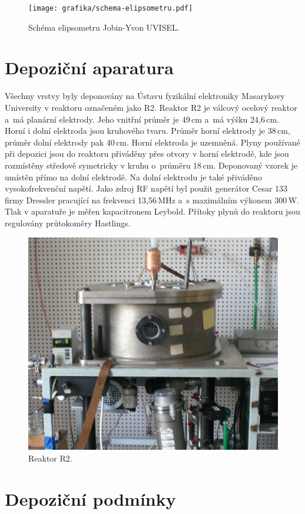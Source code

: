 \begin{figure}
	\centering
	\texttt{[image: grafika/schema-elipsometru.pdf]}
	\caption{Schéma elipsometru Jobin-Yvon UVISEL.}
	\label{elipsometrimg}
\end{figure}

\section{Depoziční aparatura}
Všechny vrstvy byly deponovány na Ústavu fyzikální elektroniky Masarykovy University v reaktoru označeném jako R2. Reaktor R2 je válcový ocelový reaktor a~má planární elektrody. Jeho vnitřní průměr je 49\,cm a~má výšku 24,6\,cm. Horní i dolní elektroda jsou kruhového tvaru. Průměr horní elektrody je 38\,cm, průměr dolní elektrody pak 40\,cm. Horní elektroda je uzemněná. Plyny používané při depozici jsou do reaktoru přiváděny přes otvory v horní elektrodě, kde jsou rozmístěny středově symetricky v kru\-hu o~průměru 18\,cm. Deponovaný vzorek je umístěn přímo na dolní elektrodě. Na dolní elektrodu je také přiváděno vysokofrekvenční napětí. Jako zdroj RF napětí byl použit generátor Cesar 133 firmy Dressler pracující na frekvenci 13,56\,MHz a~s maximálním výkonem 300\,W. Tlak v aparatuře je měřen kapacitronem Leybold. Přítoky plynů do reaktoru jsou regulovány průtokoměry Hastlings.

\begin{figure}
	\centering
	\includegraphics[width=120mm]{grafika/R2.jpg}
	\caption{Reaktor R2.}
	\label{R2}
\end{figure}

\section{Depoziční podmínky}

